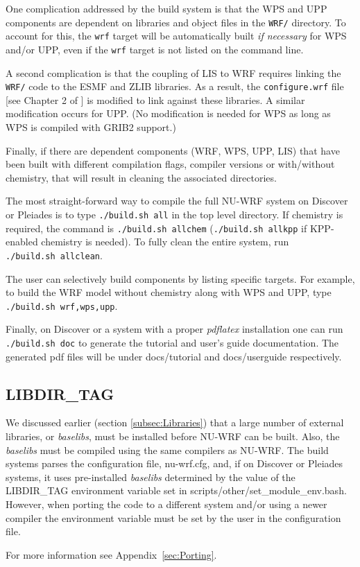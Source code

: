 One complication addressed by the build system is that the WPS and
UPP components are dependent on libraries and object files in the
\texttt{WRF/} directory. To account for this, the \texttt{wrf} target
will be automatically built  \textit{if necessary} for WPS and/or UPP, 
even if the \texttt{wrf} target is not listed on the command line.

A second complication is that the coupling of LIS to WRF requires linking 
the \texttt{WRF/} code to the ESMF and ZLIB libraries. As a result, the 
\texttt{configure.wrf} file [see Chapter 2 of \cite{ref:ArwUserGuide}] is 
modified to link against these libraries. A similar modification occurs for 
UPP. (No modification is needed for WPS as long as WPS is compiled with GRIB2 
support.)

Finally, if there are dependent components (WRF, WPS, UPP, LIS) that have been 
built with different  compilation flags, compiler versions or with/without chemistry, that will 
result in cleaning the associated directories.

The most straight-forward way to compile the full NU-WRF system on Discover or
Pleiades is to type \texttt{./build.sh all} in the top level directory. If
chemistry is required, the command is \texttt{./build.sh~allchem} 
(\texttt{./build.sh~allkpp} if KPP-enabled chemistry is needed). To fully
clean the entire system, run \texttt{./build.sh~allclean}. 

The user can selectively build components by listing specific targets. For
example, to build the WRF model without chemistry along with WPS and UPP,
type \texttt{./build.sh wrf,wps,upp}.

Finally, on Discover or a system with a proper \emph{pdflatex} installation one can run 
\texttt{./build.sh~doc} to generate the tutorial and user's guide documentation. The generated pdf files will be under docs/tutorial and docs/userguide respectively.

\subsection{LIBDIR\_TAG}
\label{subsec:libdir}
We discussed earlier (section \ref{subsec:Libraries}) that a large number of external 
libraries, or \emph{baselibs},  must be installed before NU-WRF can be built. Also, the 
\emph{baselibs} must be compiled using the same  compilers as NU-WRF.  The build 
systems parses the configuration file, nu-wrf.cfg, and, if on Discover or Pleiades systems, 
it uses pre-installed \emph{baselibs} determined by the value of the LIBDIR\_TAG environment 
variable set in scripts/other/set\_module\_env.bash. However, when porting the code to a 
different system and/or using a newer compiler the environment variable must be set by the user 
in the configuration file. 

For more information see Appendix~\ref{sec:Porting}. 



